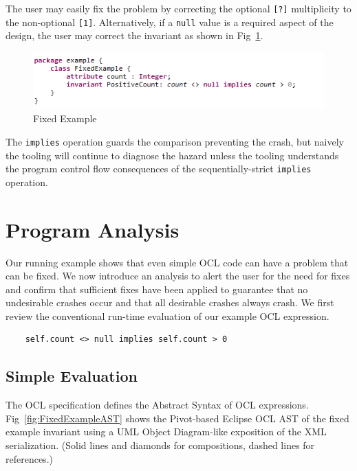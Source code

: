 \documentclass[
]{ceurart}
\begin{document}
The user may easily fix the problem by correcting the optional \verb|[?]| multiplicity to the non-optional \verb|[1]|. Alternatively, if a \verb|null| value is a required aspect of the design, the user may correct the invariant as shown in Fig~\ref{fig:FixedExample}.

\begin{figure}
	\vspace{-10pt}
	\begin{center}
		\includegraphics[width=6.0in]{FixedExample.png}
	\end{center}
	\vspace{-10pt}
	\caption{Fixed Example}
	\label{fig:FixedExample}
	\vspace{-10pt}
\end{figure}

The \verb|implies| operation guards the comparison preventing the crash, but naively the tooling will continue to diagnose the hazard unless the tooling understands the program control flow consequences of the sequentially-strict \verb|implies| operation.

\section{Program Analysis}\label{Program Analysis}

Our running example shows that even simple OCL code can have a problem that can be fixed. We now introduce an analysis to alert the user for the need for fixes and confirm that sufficient fixes have been applied to guarantee that no undesirable crashes occur and that all desirable crashes always crash. We first review the conventional run-time evaluation of our example OCL expression.

\begin{verbatim}
    self.count <> null implies self.count > 0
\end{verbatim}

\subsection{Simple Evaluation}\label{Simple Evaluation}

The OCL specification defines the Abstract Syntax of OCL expressions. Fig~\ref{fig:FixedExampleAST} shows the Pivot-based Eclipse OCL AST of the fixed example invariant using a UML Object Diagram-like exposition of the XML serialization. (Solid lines and diamonds for compositions, dashed lines for references.)
\end{document}
